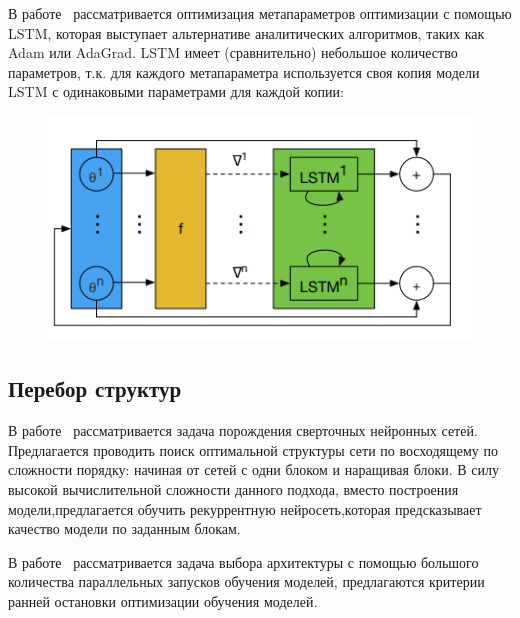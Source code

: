 В работе~\cite{l2l_by_gd_gd} рассматривается оптимизация метапараметров оптимизации с помощью LSTM, которая выступает альтернативе аналитических алгоритмов, таких как Adam или AdaGrad. LSTM имеет  (сравнительно) небольшое количество параметров, т.к. для каждого метапараметра используется своя копия модели LSTM с одинаковыми параметрами для каждой копии:
\begin{figure}[H]
\includegraphics[width=\textwidth]{./arch_review_figs/l2lbygd.png}
\end{figure}




\subsection{Перебор структур}
В работе~\cite{search_smbo} рассматривается задача порождения сверточных нейронных сетей. Предлагается проводить поиск оптимальной структуры сети по восходящему по сложности порядку: начиная от сетей с одни блоком и наращивая блоки. В силу высокой вычислительной сложности данного подхода, вместо построения модели,предлагается обучить рекуррентную нейросеть,которая предсказывает качество модели по заданным блокам. 


В работе~\cite{optimal_racing} рассматривается задача выбора архитектуры с помощью большого количества параллельных запусков обучения моделей, предлагаются критерии ранней остановки оптимизации обучения моделей.


